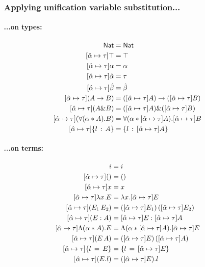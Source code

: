 \documentclass{article}
\newcommand{\mypar}[1]{\vspace{0.2cm}\paragraph{#1:} \hfill\vspace{0.1cm}}
\begin{document}
\subsubsection{Applying unification variable substitution...}
\begin{minipage}[t]{0.5\textwidth}
  \mypar{{...on types}}
  \begin{align*}
    [\unification{\alpha}{\tau}]\nat                  &= \nat\\
    [\unification{\alpha}{\tau}]\top                  &= \top\\
    [\unification{\alpha}{\tau}]\alpha                &= \alpha\\
    [\unification{\alpha}{\tau}]\hat\alpha            &= \tau\\
    [\unification{\alpha}{\tau}]\hat\beta             &= \hat\beta\\
    [\unification{\alpha}{\tau}](A\to B)              &= ([\unification{\alpha}{\tau}]A)\to([\unification{\alpha}{\tau}]B)\\
    [\unification{\alpha}{\tau}](A\& B)               &= ([\unification{\alpha}{\tau}]A)\&([\unification{\alpha}{\tau}]B)\\
    [\unification{\alpha}{\tau}](\Tabs{\alpha}{A}{B}) &= \Tabs{\alpha}{[\unification{\alpha}{\tau}]A}{[\unification{\alpha}{\tau}]B}\\
    [\unification{\alpha}{\tau}]\trecord{l}{A}        &= \trecord{l}{[\unification{\alpha}{\tau}]A}
  \end{align*}
\end{minipage}
\begin{minipage}[t]{0.5\textwidth}
  \mypar{{...on terms}}
  \begin{align*}
    [\unification{\alpha}{\tau}]i &= i\\
    [\unification{\alpha}{\tau}]() &= ()\\
    [\unification{\alpha}{\tau}]x &= x\\
    [\unification{\alpha}{\tau}]\abs{x}{E} &= \abs{x}{[\unification{\alpha}{\tau}]E}\\
    [\unification{\alpha}{\tau}](E_1\,E_2) &= ([\unification{\alpha}{\tau}]E_1)\,([\unification{\alpha}{\tau}]E_2)\\
    [\unification{\alpha}{\tau}](E : A) &= [\unification{\alpha}{\tau}]E : [\unification{\alpha}{\tau}]A\\
    [\unification{\alpha}{\tau}]\tabs{\alpha}{A}{E} &= \tabs{\alpha}{[\unification{\alpha}{\tau}]A}{[\unification{\alpha}{\tau}]E}\\
    [\unification{\alpha}{\tau}](E\,A) &= ([\unification{\alpha}{\tau}]E)\, ([\unification{\alpha}{\tau}]A)\\
    [\unification{\alpha}{\tau}]\record{l}{E} &= \record{l}{[\unification{\alpha}{\tau}]E}\\
    [\unification{\alpha}{\tau}](E.l) &= ([\unification{\alpha}{\tau}]E).l
  \end{align*}
\end{minipage}\\
\end{document}

